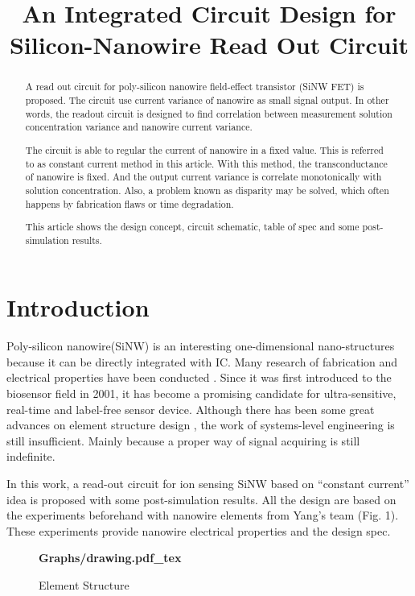 \documentclass{article}
\title{An Integrated Circuit Design for Silicon-Nanowire Read Out Circuit}
\begin{document}
%
\maketitle
%
\begin{abstract}
A read out circuit for poly-silicon nanowire field-effect transistor (SiNW FET) is proposed.
The circuit use current variance of nanowire as small signal output.
In other words, the readout circuit is designed to find correlation between measurement solution concentration variance and nanowire current variance.

The circuit is able to regular the current of nanowire in a fixed value.
This is referred to as constant current method in this article.
With this method, the transconductance of nanowire is fixed. And the output current variance is correlate monotonically with solution concentration.
Also, a problem known as disparity may be solved, which often happens by fabrication flaws or time degradation.

This article shows the design concept, circuit schematic, table of spec and some post-simulation results.
\end{abstract}
%
\section{Introduction}
\label{sec:intro}

Poly-silicon nanowire(SiNW) is an interesting one-dimensional nano-structures because it can be directly integrated with IC.
Many research of fabrication and electrical properties have been conducted \cite{J1}.
Since it was first introduced to the biosensor field in 2001\cite{J2}, it has become a promising candidate for ultra-sensitive, real-time and label-free  sensor device.
Although there has been some great advances on element structure design \cite{J3}, the work of systems-level engineering is still insufficient.
Mainly because a proper way of signal acquiring is still indefinite.

In this work, a read-out circuit for ion sensing SiNW based on “constant current” idea is proposed with some post-simulation results.
All the design are based on the experiments beforehand with nanowire elements from Yang's team (Fig. 1\cite{J7}).
These experiments provide nanowire electrical properties and the design spec.



\begin{figure}[b]
    \centering
    {\selectfont\textbf{
        \def\svgwidth{5.0cm}
        \fontsize{6}{7}\selectfont
         {Graphs/drawing.pdf_tex}
    }}
    \fontsize{6}{7}\selectfont
    \caption{Element Structure}
    \label{fig:res}
\end{figure}
\end{document}

